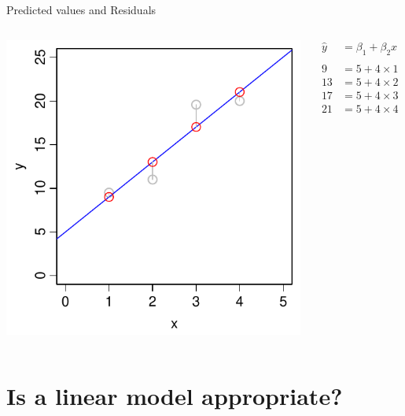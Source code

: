 \documentclass[xcolor=x11names,handout,compress]{beamer}
\renewcommand{\(}{\begin{columns}}
\renewcommand{\)}{\end{columns}}
\newcommand{\<}[1]{\begin{column}{#1}}
\renewcommand{\>}{\end{column}}
\begin{document}
\begin{frame}{Predicted values and Residuals}

\begin{columns}[T]

		\includegraphics[width=\textwidth]{Predicted.pdf}
		
		\begin{align*}
		  \hat{y}  &= \beta_1 + \beta_2 x  \\
		  \\
		  9  &= 5 + 4 \times 1 \\
		  13 &= 5 + 4 \times 2 \\
		  17 &= 5 + 4 \times 3 \\
		  21 &= 5 + 4 \times 4  
		\end{align*}
\end{columns}		
\end{frame}



\section{Is a linear model appropriate?}
\end{document}
